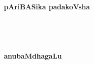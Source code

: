 \documentclass[twoside,11pt,openany]{book}
\begin{document}

\newpage

\mainmatter

\setlength{\columnseprule}{.5pt}

\newpage
~\phantom{a}
\thispagestyle{empty}
\vfill
\begin{center}
{\Huge\bf pAriBASika padakoVsha}
\end{center}
\vfill\eject
\phantom{a}~
\thispagestyle{empty}
\newpage

\newpage
~\phantom{a}
\thispagestyle{empty}
\vfill
\begin{center}
{\fontsize{30pt}{32pt}\selectfont\bf anubaMdhagaLu}
\bigskip
\bigskip

{\bf{}}
\end{center}
\vfill\eject
\phantom{a}~
\thispagestyle{empty}
\newpage

\end{document}
